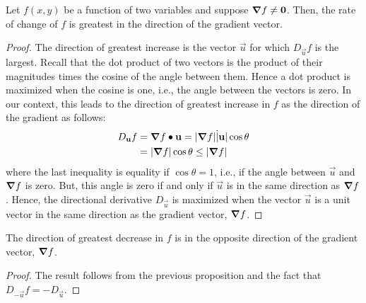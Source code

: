 \documentclass[handout]{ximera}
\begin{document}


\begin{proposition}
Let $f(x,y)$ be a function of two variables and suppose $\boldsymbol\nabla f \neq \mathbf 0$. 
Then, the rate of change of $f$ is greatest in the direction of the gradient vector.

\end{proposition}

\begin{proof}
The direction of greatest increase is the vector $\vec u$ for which $D_{\vec u}f$ is the largest. 
Recall that the dot product of two vectors is the product of their magnitudes times the cosine of the angle between them.  
Hence a dot product is maximized when the cosine is one, i.e., the angle between the vectors is zero.  
In our context, this leads to the direction of greatest
increase in $f$ as the direction of the gradient as follows:
\begin{align*}
D_{\mathbf u} f &= \boldsymbol\nabla f \bullet \mathbf u = |\boldsymbol\nabla f| \dot |\mathbf u| \cos \theta\\
             &= |\boldsymbol\nabla f| \cos \theta \leq |\boldsymbol\nabla f|
\end{align*}
where the last inequality is equality if $\cos \theta = 1$, i.e., if the angle between $\vec u$ and $\boldsymbol\nabla f$ is zero.
But, this angle is zero if and only if $\vec u$ is in the same direction as $\boldsymbol\nabla f$.  Hence, the directional derivative
$D_{\vec u}$ is maximized when the vector $\vec u$ is a unit vector in the same direction as the gradient vector, $\boldsymbol\nabla f$.
\end{proof}

\begin{corollary}
The direction of greatest decrease in $f$ is in the opposite direction of the gradient vector, $\boldsymbol\nabla f$.
\end{corollary}
\begin{proof}
The result follows from the previous proposition and the fact that $D_{-\vec u} f = -D_{\vec u}$.
\end{proof}

\end{document}
